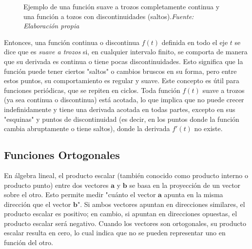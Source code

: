\begin{figure}[H]
\begin{minipage}{0.5\textwidth}
	\end{minipage}
	\caption[Ejemplo de una función suave a trozos completamente continua y una función a tozos con discontinuidades (saltos).]{Ejemplo de una función suave a trozos completamente continua y una función a tozos con discontinuidades (saltos).\textit{Fuente: Elaboración propia}}
	\label{fig:funcion-suave-trozos}  %
\end{figure}
Entonces, una función continua o discontinua \( f(t) \) definida en todo el eje \( t \) se dice que es \textit{suave a trozos} si, en cualquier intervalo finito, se comporta de manera que su derivada es continua o tiene pocas discontinuidades. Esto significa que la función puede tener ciertos "saltos" o cambios bruscos en su forma, pero entre estos puntos, su comportamiento es regular y suave. Este concepto es útil para funciones periódicas, que se repiten en ciclos. Toda función \( f(t) \) suave a trozos (ya sea continua o discontinua) está acotada, lo que implica que no puede crecer indefinidamente y tiene una derivada acotada en todas partes, excepto en sus "esquinas" y puntos de discontinuidad (es decir, en los puntos donde la función cambia abruptamente o tiene saltos), donde la derivada \( f'(t) \) no existe. ~\cite{fourierTolstov}

\subsection{Funciones Ortogonales}
En álgebra lineal, el producto escalar (también conocido como producto interno o producto punto) entre dos vectores \(\mathbf{a}\) y \(\mathbf{b}\) se basa en la proyección de un vector sobre el otro. Esto permite medir "cuánto el vector \(\mathbf{a}\) apunta en la misma dirección que el vector \(\mathbf{b}\)". Si ambos vectores apuntan en direcciones similares, el producto escalar es positivo; en cambio, si apuntan en direcciones opuestas, el producto escalar será negativo. Cuando los vectores son ortogonales, su producto escalar resulta en cero, lo cual indica que no se pueden representar uno en función del otro. \cite{algebraLinealPoole}

